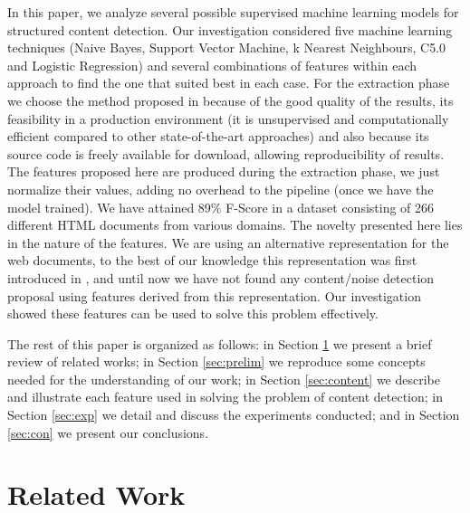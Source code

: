 In this paper, we analyze several possible supervised machine learning models
for structured content detection. Our investigation considered five machine
learning techniques (Naive Bayes, Support Vector Machine, k Nearest Neighbours,
C5.0 and Logistic Regression) and several combinations of features within each
approach to find the one that suited best in each case. For the extraction phase
we choose the method proposed in \cite{Velloso:2017:ERW:3132847.3132875} because
of the good quality of the results, its feasibility in a production environment
(it is unsupervised and computationally efficient compared to other
state-of-the-art approaches) and also because its source code is freely
available for download, allowing reproducibility of results.
The features proposed here are produced during the extraction phase, we just
normalize their values, adding no overhead to the pipeline (once we have the
model trained). We have attained 89\% F-Score in a dataset consisting of 266
different HTML documents from various domains. The novelty presented here lies
in the nature of the features. We are using an alternative representation for
the web documents, to the best of our knowledge this representation was first
introduced in \cite{TPC09}, and until now we have not found any content/noise
detection proposal using features derived from this representation. Our
investigation showed these features can be used to solve this problem
effectively. 

The rest of this paper is organized as follows: in Section \ref{sec:related} we
present a brief review of related works; in Section \ref{sec:prelim} we
reproduce some concepts needed for the understanding of our work; in Section
\ref{sec:content} we describe and illustrate each feature used in solving the
problem of content detection; in Section \ref{sec:exp} we detail and discuss the
experiments conducted; and in Section \ref{sec:con} we present our conclusions.

\section{Related Work}\label{sec:related}


